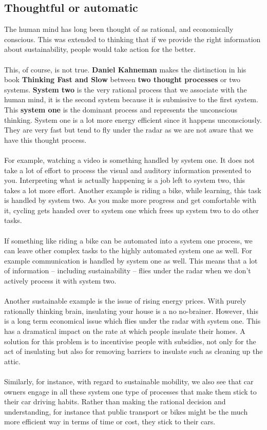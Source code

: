 \documentclass[../summary.tex]{subfiles}
\begin{document}
\newpage
\subsection{Thoughtful or automatic}
The human mind has long been thought of as rational, and economically conscious. This was extended to thinking that if we provide the right information about sustainability, people would take action for the better.
\\\\
This, of course, is not true. \textbf{Daniel Kahneman} makes the distinction in his book \textbf{Thinking Fast and Slow} between \textbf{two thought processes} or two systems. \textbf{System two} is the very rational process that we associate with the human mind, it is the second system because it is submissive to the first system. This \textbf{system one} is the dominant process and represents the unconscious thinking. System one is a lot more energy efficient since it happens unconsciously. They are very fast but tend to fly under the radar as we are not aware that we have this thought process.
\\\\
For example, watching a video is something handled by system one. It does not take a lot of effort to process the visual and auditory information presented to you. Interpreting what is actually happening is a job left to system two, this takes a lot more effort. Another example is riding a bike, while learning, this task is handled by system two. As you make more progress and get comfortable with it, cycling gets handed over to system one which frees up system two to do other tasks.
\\\\
If something like riding a bike can be automated into a system one process, we can leave other complex tasks to the highly automated system one as well. For example communication is handled by system one as well. This means that a lot of information -- including sustainability -- flies under the radar when we don't actively process it with system two.
\\\\
Another sustainable example is the issue of rising energy prices. With purely rationally thinking brain, insulating your house is a no no-brainer. However, this is a long term economical issue which flies under the radar with system one. This has a dramatical impact on the rate at which people insulate their homes. A solution for this problem is to incentivise people with subsidies, not only for the act of insulating but also for removing barriers to insulate such as cleaning up the attic.
\\\\
Similarly, for instance, with regard to sustainable mobility, we also see that car owners engage in all these system one type of processes that make them stick to their car driving habits. Rather than making the rational decision and understanding, for instance that public transport or bikes might be the much more efficient way in terms of time or cost, they stick to their cars.
\newpage
\end{document}
